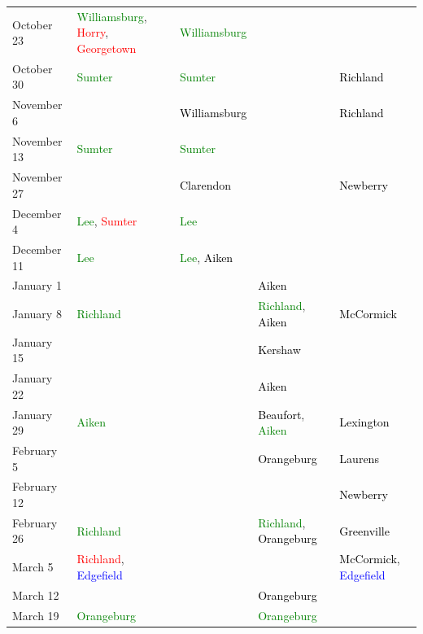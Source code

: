 \documentclass[11pt, oneside]{article}   	%
\theoremstyle{ModifiedStyle}
\begin{document}
\begin{table}[H]
{\begin{tabular}{L{23mm}C{55mm}C{38mm}C{38mm}C{38mm}}
			\rule{0pt}{2.3ex} October 23 &  \textcolor{green}{Williamsburg}, \textcolor{red}{Horry}, \textcolor{red}{Georgetown} & \textcolor{green}{Williamsburg} & &\\
			\rule{0pt}{2.3ex} October 30 &  \textcolor{green}{Sumter} & \textcolor{green}{Sumter} & &  \textcolor{black}{Richland}\\
			\rule{0pt}{2.3ex} November 6 & & \textcolor{black}{Williamsburg} & &  \textcolor{black}{Richland}\\\rule{0pt}{2.3ex} November 13 &  \textcolor{green}{Sumter} & \textcolor{green}{Sumter} & &\\
			\rule{0pt}{2.3ex} November 27 & & \textcolor{black}{Clarendon} & &  \textcolor{black}{Newberry}\\
			\rule{0pt}{2.3ex} December 4 &  \textcolor{green}{Lee}, \textcolor{red}{Sumter} & \textcolor{green}{Lee} & &\\
			\rule{0pt}{2.3ex} December 11 &  \textcolor{green}{Lee} & \textcolor{green}{Lee}, \textcolor{black}{Aiken} & &\\
			\rule{0pt}{2.3ex} January 1 & & & \textcolor{black}{Aiken} &\\
			\rule{0pt}{2.3ex} January 8 &  \textcolor{green}{Richland} & & \textcolor{green}{Richland}, \textcolor{black}{Aiken} &  \textcolor{black}{McCormick}\\
			\rule{0pt}{2.3ex} January 15 & & & \textcolor{black}{Kershaw} &\\
			\rule{0pt}{2.3ex} January 22 & & & \textcolor{black}{Aiken} &\\
			\rule{0pt}{2.3ex} January 29 &  \textcolor{green}{Aiken} & & \textcolor{black}{Beaufort}, \textcolor{green}{Aiken} &  \textcolor{black}{Lexington}\\
			\rule{0pt}{2.3ex} February 5 & & & \textcolor{black}{Orangeburg} &  \textcolor{black}{Laurens}\\
			\rule{0pt}{2.3ex} February 12 & & & &  \textcolor{black}{Newberry}\\
			\rule{0pt}{2.3ex} February 26 &  \textcolor{green}{Richland} & & \textcolor{green}{Richland}, \textcolor{black}{Orangeburg} &  \textcolor{black}{Greenville}\\
			\rule{0pt}{2.3ex} March 5 &  \textcolor{red}{Richland}, \textcolor{blue}{Edgefield} & & &  \textcolor{black}{McCormick}, \textcolor{blue}{Edgefield}\\
			\rule{0pt}{2.3ex} March 12 & & & \textcolor{black}{Orangeburg} &\\
			\rule{0pt}{2.3ex} March 19 &  \textcolor{green}{Orangeburg} & & \textcolor{green}{Orangeburg} &\\

\end{tabular}}
\end{table}
\end{document}
